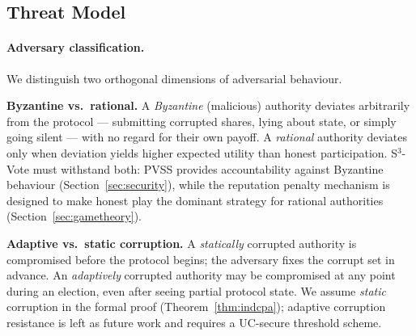 \documentclass[12pt,a4paper]{article}
\theoremstyle{definition}
\theoremstyle{remark}
\begin{document}
\subsection{Threat Model}

\paragraph{Adversary classification.}
We distinguish two orthogonal dimensions of adversarial behaviour.

\textbf{Byzantine vs.\ rational.}
A \emph{Byzantine} (malicious) authority deviates arbitrarily from the
protocol — submitting corrupted shares, lying about state, or simply
going silent — with no regard for their own payoff.
A \emph{rational} authority deviates only when deviation yields higher
expected utility than honest participation.
S$^3$-Vote must withstand both: PVSS provides accountability against
Byzantine behaviour (Section~\ref{sec:security}), while the reputation
penalty mechanism is designed to make honest play the dominant strategy
for rational authorities (Section~\ref{sec:gametheory}).

\textbf{Adaptive vs.\ static corruption.}
A \emph{statically} corrupted authority is compromised before the
protocol begins; the adversary fixes the corrupt set in advance.
An \emph{adaptively} corrupted authority may be compromised at any
point during an election, even after seeing partial protocol state.
We assume \emph{static} corruption in the formal proof
(Theorem~\ref{thm:indcpa}); adaptive corruption resistance is left as
future work and requires a UC-secure threshold scheme.
\end{document}
